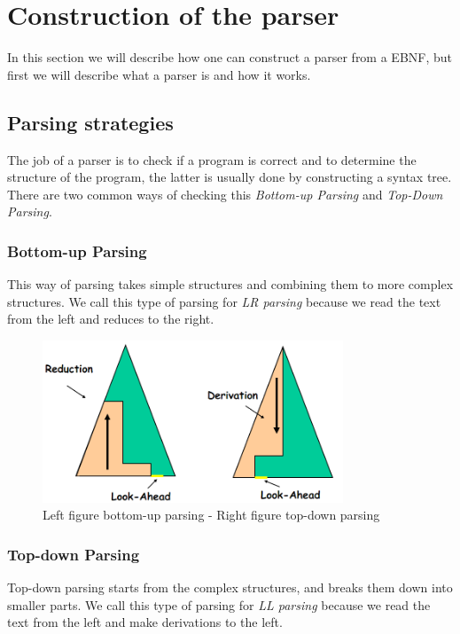 \section{Construction of the parser}
	In this section we will describe how one can construct a parser from a EBNF, but first we will describe what a parser is and how it works.
	
	\subsection{Parsing strategies}
		The job of a parser is to check if a program is correct and 
		to determine the structure of the program, the latter is usually done by constructing a syntax tree.
		There are two common ways of checking this {\it Bottom-up Parsing} and {\it Top-Down Parsing}.
		
		\subsubsection*{Bottom-up Parsing}
			This way of parsing takes simple structures and combining them to more complex structures.
			We call this type of parsing for {\it LR parsing} because we read the text from the left and reduces to the right.
			\begin{figure}[H]
				\centering
				\includegraphics[width=0.8\textwidth]{rapport/2/figures/parsestrat.png}
				\caption{Left figure bottom-up parsing - Right figure top-down parsing}\label{fig:lrparse}
			\end{figure}
			
		\subsubsection*{Top-down Parsing}
			Top-down parsing starts from the complex structures, and breaks them down into smaller parts.
			We call this type of parsing for {\it LL parsing} because we read the text from the left and make derivations to the left.
		
